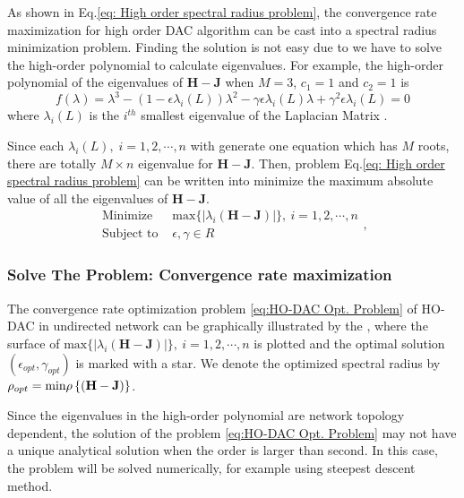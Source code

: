 As shown in Eq.\eqref{eq: High order spectral radius problem}, the
convergence rate maximization for high order DAC algorithm can be
cast into a spectral radius minimization problem. Finding the solution
is not easy due to we have to solve the high-order polynomial to calculate
eigenvalues. For example, the high-order polynomial of the eigenvalues
of $\mathbf{H-J}$ when $M=3$, $c_{1}=1$ and $c_{2}=1$ is 
\begin{equation}
f(\lambda)=\lambda^{3}-\left(1-\epsilon\lambda_{i}\left(L\right)\right)\lambda^{2}-\gamma\epsilon\lambda_{i}\left(L\right)\lambda+\gamma^{2}\epsilon\lambda_{i}\left(L\right)=0\label{eq: eigenvalue equation of H-J}
\end{equation}
where $\lambda_{i}(L)$ is the $i^{th}$ smallest eigenvalue
of the Laplacian Matrix \cite{Xiong10}. 

Since each $\lambda_{i}(L),\; i=1,2,\cdots,n$ with generate
one equation which has $M$ roots, there are totally $M\times n$
eigenvalue for $\mathbf{H-J}$. Then, problem Eq.\eqref{eq: High order spectral radius problem}
can be written into minimize the maximum absolute value of all the
eigenvalues of $\mathbf{H-J}$. 
\begin{equation}
\begin{array}{cc}
\mbox{Minimize } & \mbox{max}\{\left|\lambda_{i}\left(\mathbf{H-J}\right)\right|\},\: i=1,2,\cdots,n\\
\mbox{Subject to } & \epsilon,\gamma\in R
\end{array},\label{eq:HO-DAC Opt. Problem}
\end{equation}



\subsubsection{Solve The Problem: Convergence rate maximization}

The convergence rate optimization problem \ref{eq:HO-DAC Opt. Problem}
of HO-DAC in undirected network can be graphically illustrated by
the , where the surface of $\mbox{max}\{\left|\lambda_{i}\left(\mathbf{H-J}\right)\right|\},\: i=1,2,\cdots,n$
is plotted and the optimal solution $\left(\epsilon{}_{opt},\gamma_{opt}\right)$
is marked with a star. We denote the optimized spectral radius by
$\rho_{opt}=\mbox{\mbox{min}}\rho\left\{ \left(\mathbf{H}-\mathbf{J}\right)\right\} $. 

Since the eigenvalues in the high-order polynomial 
are network topology dependent, the solution of the problem \ref{eq:HO-DAC Opt. Problem}
may not have a unique analytical solution when the order is larger
than second. In this case, the problem will be solved numerically,
for example using steepest descent method. 

